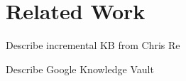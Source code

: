 

\section{Related Work}

Describe incremental KB from Chris Re

Describe Google Knowledge Vault 


